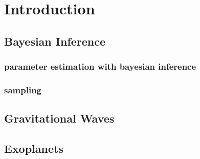 \chapter{Introduction}
\label{cp.intro}



\section{Bayesian Inference}

\subsection{parameter estimation with bayesian inference}

\subsection{sampling}


\section{Gravitational Waves}

\section{Exoplanets}